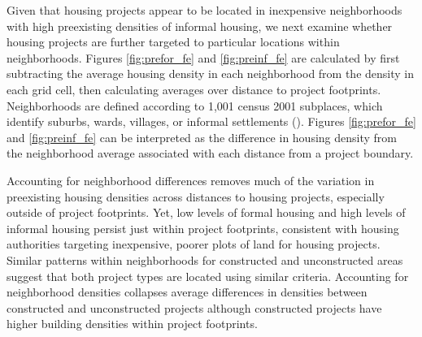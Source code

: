 \documentclass[12pt]{article}
\begin{document}
Given that housing projects appear to be located in inexpensive neighborhoods with high preexisting densities of informal housing, we next examine whether housing projects are further targeted to particular locations within neighborhoods.  Figures \ref{fig:prefor_fe} and \ref{fig:preinf_fe} are calculated by first subtracting the average housing density in each neighborhood from the density in each grid cell, then calculating averages over distance to project footprints.  Neighborhoods are defined according to 1,001 census 2001 subplaces, which identify suburbs, wards, villages, or informal settlements (\cite{censusmeta}).  Figures \ref{fig:prefor_fe} and \ref{fig:preinf_fe} can be interpreted as the difference in housing density from the neighborhood average associated with each distance from a project boundary.  

Accounting for neighborhood differences removes much of the variation in preexisting housing densities across distances to housing projects, especially outside of project footprints.  Yet, low levels of formal housing and high levels of informal housing persist just within project footprints, consistent with housing authorities targeting inexpensive, poorer plots of land for housing projects.  Similar patterns within neighborhoods for constructed and unconstructed areas suggest that both project types are located using similar criteria.  Accounting for neighborhood densities collapses average differences in densities between constructed and unconstructed projects although constructed projects have higher building densities within project footprints.  

\end{document}
